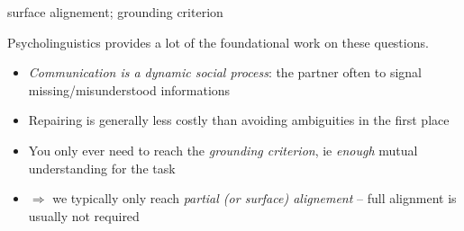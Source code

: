 \documentclass[compress]{beamer}
\begin{document}



{
\begin{frame}{surface alignement; grounding criterion}

    Psycholinguistics provides a lot of the foundational work on these
    questions.

    \begin{itemize}
        \item<+-> \emph{Communication is a dynamic social process}: the partner often to signal
            missing/misunderstood informations
        \item<+-> Repairing is generally less costly than avoiding ambiguities in
            the first place
        \item<+-> You only ever need to reach the \emph{grounding criterion}, ie
            \emph{enough} mutual understanding for the task
        \item<+-> $\Rightarrow$ we typically only reach \emph{partial (or surface)
            alignement} -- full alignment is usually not required
    \end{itemize}
\end{frame}
}
\end{document}
